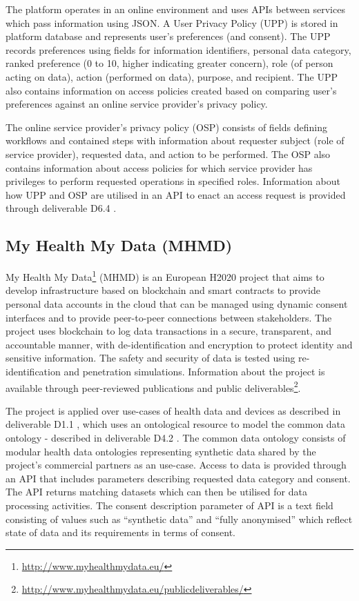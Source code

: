 The platform operates in an online environment and uses APIs between services which pass information using JSON. A User Privacy Policy (UPP) \cite{noauthor_d6.7_2017} is stored in platform database and represents user's preferences (and consent). The UPP records preferences using fields for information identifiers, personal data category, ranked preference (0 to 10, higher indicating greater concern), role (of person acting on data), action (performed on data), purpose, and recipient. The UPP also contains information on access policies created based on comparing user's preferences against an online service provider's privacy policy. 

The online service provider's privacy policy (OSP) \cite{noauthor_d6.7_2017} consists of fields defining workflows and contained steps with information about requester subject (role of service provider), requested data, and action to be performed. The OSP also contains information about access policies for which service provider has privileges to perform requested operations in specified roles. Information about how UPP and OSP are utilised in an API to enact an access request is provided through deliverable D6.4 \cite{noauthor_d6.4_2017}.

\subsection*{My Health My Data (MHMD)}
My Health My Data\footnote{\url{http://www.myhealthmydata.eu/}} (MHMD) is an European H2020 project that aims to develop infrastructure based on blockchain and smart contracts to provide personal data accounts in the cloud that can be managed using dynamic consent interfaces and to provide peer-to-peer connections between stakeholders. The project uses blockchain to log data transactions in a secure, transparent, and accountable manner, with de-identification and encryption to protect identity and sensitive information. The safety and security of data is tested using re-identification and penetration simulations.
Information about the project is available through peer-reviewed publications and public deliverables\footnote{\url{http://www.myhealthmydata.eu/publicdeliverables/}}.

The project is applied over use-cases of health data and devices as described in deliverable D1.1 \cite{noauthor_d1.1_2017}, which uses an ontological resource to model the common data ontology - described in deliverable D4.2 \cite{teodoro_d4.2_2018}. The common data ontology consists of modular health data ontologies representing synthetic data shared by the project's commercial partners as an use-case.
Access to data is provided through an API that includes parameters describing requested data category and consent. The API returns matching datasets which can then be utilised for data processing activities. The consent description parameter of API is a text field consisting of values such as ``synthetic data'' and ``fully anonymised'' which reflect state of data and its requirements in terms of consent. 

